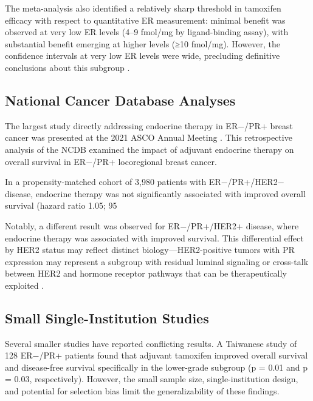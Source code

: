 \documentclass{article}
\begin{document}
The meta-analysis also identified a relatively sharp threshold in tamoxifen efficacy with respect to quantitative ER measurement: minimal benefit was observed at very low ER levels (4–9 fmol/mg by ligand-binding assay), with substantial benefit emerging at higher levels (≥10 fmol/mg). However, the confidence intervals at very low ER levels were wide, precluding definitive conclusions about this subgroup \citep{ebctcg2011}.

\subsection{National Cancer Database Analyses}

The largest study directly addressing endocrine therapy in ER−/PR+ breast cancer was presented at the 2021 ASCO Annual Meeting \citep{asco2021ncdb}. This retrospective analysis of the NCDB examined the impact of adjuvant endocrine therapy on overall survival in ER−/PR+ locoregional breast cancer.

In a propensity-matched cohort of 3,980 patients with ER−/PR+/HER2− disease, endocrine therapy was not significantly associated with improved overall survival (hazard ratio 1.05; 95%

Notably, a different result was observed for ER−/PR+/HER2+ disease, where endocrine therapy was associated with improved survival. This differential effect by HER2 status may reflect distinct biology—HER2-positive tumors with PR expression may represent a subgroup with residual luminal signaling or cross-talk between HER2 and hormone receptor pathways that can be therapeutically exploited \citep{asco2021ncdb}.

\subsection{Small Single-Institution Studies}

Several smaller studies have reported conflicting results. A Taiwanese study \citep{cheng2012} of 128 ER−/PR+ patients found that adjuvant tamoxifen improved overall survival and disease-free survival specifically in the lower-grade subgroup (p = 0.01 and p = 0.03, respectively). However, the small sample size, single-institution design, and potential for selection bias limit the generalizability of these findings.
\end{document}
